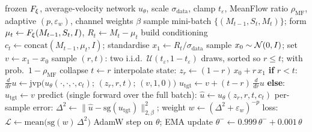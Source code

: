 \begin{algorithm}[t]
\caption{MeanFlow training step (average-velocity matching on the standardised residual)}
\label{alg:meanflow}
\begin{algorithmic}[1]
\Require frozen $F_{\xi}$, average-velocity network $u_\theta$, scale $\sigma_{\text{data}}$, clamp $t_\varepsilon$, MeanFlow ratio $\rho_{\text{MF}}$, adaptive $(p, \varepsilon_w)$, channel weights $\beta$
\State sample mini-batch $\{(M_{t-1}, S_t, M_t)\}$; form $\mu_t \gets F_{\xi}(M_{t-1}, S_t, I)$, $R_t \gets M_t - \mu_t$
\State build conditioning $c_t \gets \mathrm{concat}(M_{t-1}, \mu_t, I)$; standardise $x_1 \gets R_t / \sigma_{\text{data}}$
\State sample $x_0 \sim \mathcal{N}(0, I)$; set $v \gets x_1 - x_0$
\State sample $(r, t)$: two i.i.d.\ $\mathcal{U}(t_\varepsilon, 1 - t_\varepsilon)$ draws, sorted so $r \le t$; with prob.\ $1 - \rho_{\text{MF}}$ collapse $t \gets r$
\State interpolate state: $z_r \gets (1 - r)\, x_0 + r\, x_1$
\State \textbf{if} $r < t$: $\frac{d}{dr}u \gets \mathrm{jvp}\bigl(u_\theta(\cdot, \cdot, \cdot, c_t);\, (z_r, r, t);\, (v, 1, 0)\bigr)$ 
\State \hspace{\algorithmicindent} $u_{\text{tgt}} \gets v + (t - r)\, \frac{d}{dr}u$ \quad \textbf{else}: $u_{\text{tgt}} \gets v$
\State predict (single forward over the full batch): $\hat{u} \gets u_\theta(z_r, r, t, c_t)$
\State per-sample error: $\Delta^2 \gets \|\hat{u} - \mathrm{sg}(u_{\text{tgt}})\|_{2,\beta}^2$; weight $w \gets (\Delta^2 + \varepsilon_w)^{-p}$
\State loss: $\mathcal{L} \gets \mathrm{mean}\bigl(\mathrm{sg}(w)\, \Delta^2\bigr)$
\State AdamW step on $\theta$; EMA update $\theta^{-} \gets 0.999\, \theta^{-} + 0.001\, \theta$
\end{algorithmic}
\end{algorithm}

